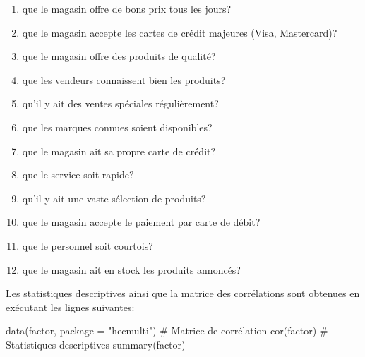 \documentclass[
  11pt,
  letterpaper,
]{scrbook}
\newenvironment{Shaded}{\begin{snugshade}}{\end{snugshade}}
\newcommand{\AttributeTok}[1]{\textcolor[rgb]{0.40,0.45,0.13}{#1}}
\newcommand{\CommentTok}[1]{\textcolor[rgb]{0.37,0.37,0.37}{#1}}
\newcommand{\FunctionTok}[1]{\textcolor[rgb]{0.28,0.35,0.67}{#1}}
\newcommand{\NormalTok}[1]{\textcolor[rgb]{0.00,0.23,0.31}{#1}}
\newcommand{\StringTok}[1]{\textcolor[rgb]{0.13,0.47,0.30}{#1}}
\providecommand{\tightlist}{%
  \setlength{\itemsep}{0pt}\setlength{\parskip}{0pt}}\usepackage{longtable,booktabs,array}
\theoremstyle{definition}
\theoremstyle{remark}
\begin{document}
\begin{enumerate}
\def\labelenumi{\arabic{enumi}.}
\tightlist
\item
  que le magasin offre de bons prix tous les jours?
\item
  que le magasin accepte les cartes de crédit majeures (Visa,
  Mastercard)?
\item
  que le magasin offre des produits de qualité?
\item
  que les vendeurs connaissent bien les produits?
\item
  qu'il y ait des ventes spéciales régulièrement?
\item
  que les marques connues soient disponibles?
\item
  que le magasin ait sa propre carte de crédit?
\item
  que le service soit rapide?
\item
  qu'il y ait une vaste sélection de produits?
\item
  que le magasin accepte le paiement par carte de débit?
\item
  que le personnel soit courtois?
\item
  que le magasin ait en stock les produits annoncés?
\end{enumerate}

Les statistiques descriptives ainsi que la matrice des corrélations sont
obtenues en exécutant les lignes suivantes:

\begin{Shaded}
\begin{Highlighting}[]
\FunctionTok{data}\NormalTok{(factor, }\AttributeTok{package =} \StringTok{"hecmulti"}\NormalTok{)}
\CommentTok{\# Matrice de corrélation}
\FunctionTok{cor}\NormalTok{(factor)}
\CommentTok{\# Statistiques descriptives}
\FunctionTok{summary}\NormalTok{(factor)}
\end{Highlighting}
\end{Shaded}
\end{document}
